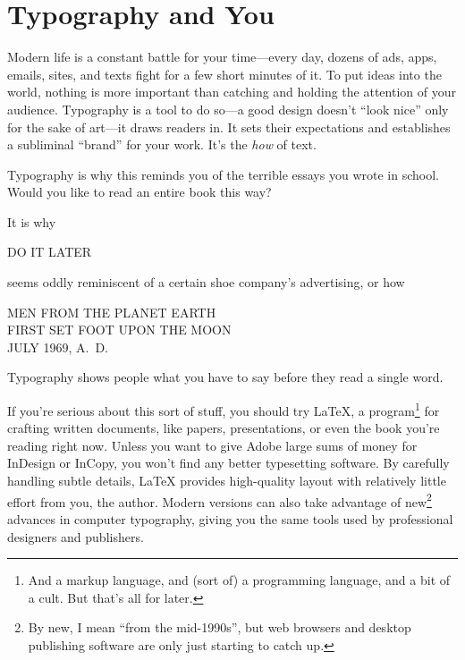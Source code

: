 \chapter{Typography and You}
\label{typography}

Modern life is a constant battle for your time---every day,
dozens of ads, apps, emails, sites, and texts fight
for a few short minutes of it.
To put ideas into the world,
nothing is more important than catching and holding
the attention of your audience.
Typography is a tool to do so---a good design doesn't ``look nice''
only for the sake of art---it draws readers in.\punckern{}
It sets their expectations and establishes a subliminal ``brand'' for your
work.\punckern{}
It's the \emph{how} of text.
\begin{leftfigure}
\fontsize{12pt}{24pt}\selectfont\raggedright
Typography is why this reminds you of the terrible essays
you wrote in school.
Would you like to read an entire book this way?
\end{leftfigure}
It is why
\begin{leftfigure}
\noindent{}\Large DO IT LATER
\end{leftfigure}
seems oddly reminiscent of a certain shoe company's advertising,
or how
\begin{center}
\noindent MEN FROM THE PLANET EARTH \\
FIRST SET FOOT UPON THE MOON \\
JULY 1969, A.~D.
\end{center}
Typography shows people
what you have to say before they read a single word.

If you're serious about this sort of stuff, you should try \LaTeX,
a program\footnote{And a markup language,
and (sort of) a programming language, and a bit of a cult.
But that's all for later.}
for crafting written documents, like papers, presentations,
or even the book you're reading right now.
Unless you want to give Adobe large sums
of money for InDesign or InCopy,
you won't find any better typesetting software.
By carefully handling subtle details,
\LaTeX{} provides high-quality layout
with relatively little effort from you, the author.
Modern versions can also take advantage of new\footnote{By new,
I mean ``from the mid-1990s''\quotekern, but web browsers and desktop publishing
software are only just starting to catch up.} advances in computer typography,
giving you the same tools used by professional designers and publishers.

